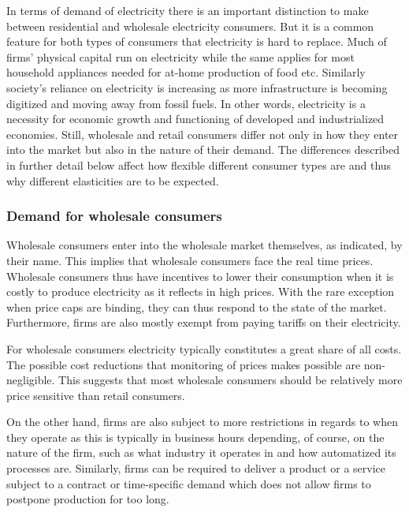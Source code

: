 In terms of demand of electricity there is an important distinction to make between residential and wholesale electricity consumers. But it is a common feature for both types of consumers that electricity is hard to replace. Much of firms' physical capital run on electricity while the same applies for most household appliances needed for at-home production of food etc. Similarly society's reliance on electricity is increasing as more infrastructure is becoming digitized and moving away from fossil fuels. In other words, electricity is a necessity for economic growth and functioning of developed and industrialized economies. Still, wholesale and retail consumers differ not only in how they enter into the market but also in the nature of their demand. The differences described in further detail below affect how flexible different consumer types are and thus why different elasticities are to be expected.

\subsubsection*{Demand for wholesale consumers}
Wholesale consumers enter into the wholesale market themselves, as indicated, by their name. This implies that wholesale consumers face the real time prices. Wholesale consumers thus have incentives to lower their consumption when it is costly to produce electricity as it reflects in high prices. With the rare exception when price caps are binding, they can thus respond to the state of the market. Furthermore, firms are also mostly exempt from paying tariffs on their electricity.
\bigskip \par
For wholesale consumers electricity typically constitutes a great share of all costs. The possible cost reductions that monitoring of prices makes possible are non-negligible. This suggests that most wholesale consumers should be relatively more price sensitive than retail consumers.
\par
On the other hand, firms are also subject to more restrictions in regards to when they operate as this is typically in business hours depending, of course, on the nature of the firm, such as what industry it operates in and how automatized its processes are. Similarly, firms can be required to deliver a product or a service subject to a contract or time-specific demand which does not allow firms to postpone production for too long.

